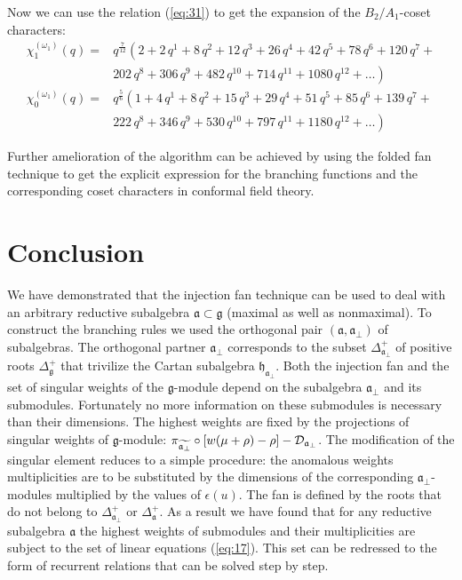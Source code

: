 \documentclass[12pt]{iopart}
\theoremstyle{definition}
\newcommand{\gf}{\mathfrak{g}}
\newcommand{\af}{\mathfrak{a}}
\newcommand{\afb}{\mathfrak{a}_{\bot}}
\newcommand{\hf}{\mathfrak{h}}
\begin{document}
Now we can use the relation (\ref{eq:31}) to get the expansion of the $B_2/A_1$-coset characters:
\begin{equation*}
  \label{eq:35}
  \begin{array}{cc}
    \chi^{(\omega_1)}_{1}(q)= & q^{\frac{7}{12}}\left( 2+2\,q^{1}+8\,q^{2}+12\,q^{3}+26\,q^{4}+42\,q^{5}+78\,q^{6}+120\,q^{7}+\right. \\
    & \left. 202\,q^{8}+306\,q^{9}+482\,q^{10}+714\,q^{11}+1080\,q^{12}+\dots \right)\\
    \chi^{(\omega_1)}_{0}(q) = & q^{\frac{5}{6}}\left(1 + 4\,q^{1}+ 8\,q^{2}+ 15\,q^{3}+ 29\,q^{4}+ 51\,q^{5}+ 85\,q^{6}+ 139\,q^{7}+\right. \\
    &\left. 222\,q^{8}+ 346\,q^{9}+ 530\,q^{10}+ 797\,q^{11}+ 1180\,q^{12}+\dots\right)
  \end{array}
\end{equation*}

Further amelioration of the algorithm can be achieved by using
the folded fan technique \cite{il2010folded} to get the explicit expression
for the branching functions and the corresponding coset characters in conformal field theory.

\section{Conclusion}
\label{sec:conclusion}
We have demonstrated that the injection fan technique can be used to deal with an arbitrary
reductive subalgebra $\af \subset \gf$ (maximal as well as  nonmaximal).
To construct the branching rules we used the orthogonal pair $\left( \af,\af_{\perp
}\right) $ of subalgebras. The orthogonal partner $\afb$ corresponds to the subset
$\Delta^{+}_{\afb}$ of positive roots $\Delta_{\mathfrak{g}}^{+}$ that trivilize
the Cartan subalgebra $\hf_{\afb}$.
Both the injection fan and the set of singular weights of the $\gf$-module depend on the
subalgebra $\afb$ and its submodules.
Fortunately no more information on these submodules is necessary than their dimensions.
The highest weights are fixed by the projections of singular weights of $\gf$-module:
$\pi _{\widetilde{\frak{%
a}_{\perp }}}\circ\left[ w(\mu +\rho )-\rho \right] -\mathcal{D}_{\af_{\perp
}}$.
The modification of the singular element reduces to a simple procedure:
the anomalous weights multiplicities are to be substituted by the dimensions of the corresponding $\afb$-modules
multiplied by the values of $\epsilon (u)$. The fan is defined by the roots that
do not belong to $\Delta^{+}_{\afb}$ or $\Delta^{+}_{\af}$. As a result we have found
that for any reductive subalgebra $\af$ the highest weights of submodules and their
multiplicities are subject to the set of linear equations (\ref{eq:17}).
This set can be redressed to the form of recurrent relations that can be solved step by step.
\end{document}
